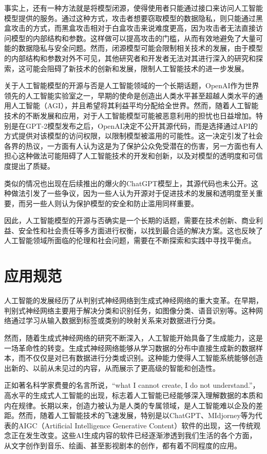 事实上，还有一种方法就是将模型闭源，使得使用者只能通过接口来访问人工智能模型提供的服务。通过这种方式，攻击者想要窃取模型的数据隐私，则只能通过黑盒攻击的方式，而黑盒攻击相对于白盒攻击来说难度更高，因为攻击者无法直接访问模型的内部结构和参数。这样做可以提高攻击的门槛，从而有效地避免了大量可能的数据隐私与安全问题。然而，闭源模型可能会限制相关技术的发展，由于模型的内部结构和参数对外不可见，其他研究者和开发者无法对其进行深入的研究和探索，这可能会阻碍了新技术的创新和发展，限制人工智能技术的进一步发展。

关于人工智能模型的开源与否是人工智能领域的一个长期话题，OpenAI作为世界领先的人工智能实验室之一，早期的使命是创造出人类水平甚至超越人类水平的通用人工智能（AGI），并且希望将其利益平均分配给全世界。然而，随着人工智能技术的不断发展和应用，对于人工智能模型可能被恶意利用的担忧也日益增加。特别是在GPT-2模型发布之后，OpenAI决定不公开其源代码，而是选择通过API的方式提供对该模型的访问权限，以限制模型被滥用的可能性。这一决定引发了社会各界的热议，一方面有人认为这是为了保护公众免受潜在的伤害，另一方面也有人担心这种做法可能阻碍了人工智能技术的开发和创新，以及对模型的透明度和可信度提出了质疑。

类似的情况也出现在后续推出的爆火的ChatGPT模型上，其源代码也未公开。这种做法引发了一些争议，因为一些人认为开源对于促进技术的发展和透明度至关重要，而另一些人则认为保护模型的安全和防止滥用同样重要。

因此，人工智能模型的开源与否确实是一个长期的话题，需要在技术创新、商业利益、安全性和社会责任等多方面进行权衡，以找到最合适的解决方案。这也反映了人工智能领域所面临的伦理和社会问题，需要在不断探索和实践中寻找平衡点。

\section{应用规范}

人工智能的发展经历了从判别式神经网络到生成式神经网络的重大变革。在早期，判别式神经网络主要用于解决分类和识别任务，如图像分类、语音识别等。这种网络通过学习从输入数据到标签或类别的映射关系来对数据进行分类。

然而，随着生成式神经网络的研究不断深入，人工智能开始具备了生成能力，这是一场革命性的转变。生成式神经网络能够从学习数据的分布中直接生成新的数据样本，而不仅仅是对已有数据进行分类或识别。这种能力使得人工智能系统能够创造出新的、以前从未见过的内容，从而展示了更高级的智能和创造性。

正如著名科学家费曼的名言所说，“what I cannot create, I do not understand.”，高水平的生成式人工智能的出现，标志着人工智能已经能够深入理解数据的本质和内在规律。长期以来，创造力被认为是人类的专属领域，是人工智能难以企及的差距。然而，随着人工智能技术的飞速发展，特别是以ChatGPT、MIdjorney等为代表的AIGC（Artificial Intelligence Generative Content）软件的出现，这一传统观念正在发生改变。这些AI生成内容的软件已经逐渐渗透到我们生活的各个方面，从文字创作到音乐、绘画、甚至影视剧本的创作，都有着不同程度的应用。

